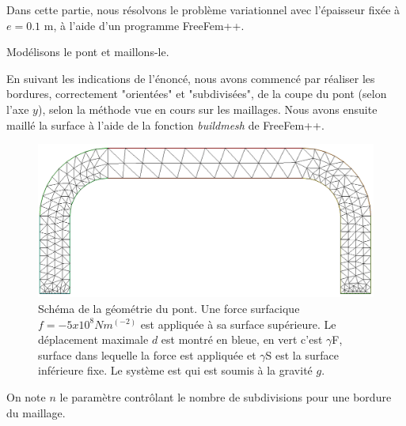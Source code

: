 
Dans cette partie, nous résolvons le problème variationnel avec l'épaisseur fixée à $e=0.1$ m, à l'aide d'un programme FreeFem++.


\begin{problem}{3}
    Modélisons le pont et maillons-le.
\end{problem}


\begin{solution}   
    En suivant les indications de l'énoncé, nous avons commencé par réaliser les bordures, correctement "orientées" et "subdivisées", de la coupe du pont (selon l'axe $y$),
    selon la méthode vue en cours sur les maillages.%
    Nous avons ensuite maillé la surface à l'aide de la fonction \emph{buildmesh} de FreeFem++.

    \begin{figure}[H]        
        \begin{center}
        
            \includegraphics[width=12cm]{imgs/all_maillage_default.PNG}
            \caption{Schéma de la géométrie du pont. Une force surfacique $f= - 5x10^8 N m^(-2)$ est appliquée à sa surface supérieure. Le déplacement maximale $d$ est montré en bleue, en vert c'est $\gamma$F, surface dans lequelle la force est appliquée et $\gamma$S est la surface inférieure fixe. Le système est qui est soumis à la gravité $g$.}
            \label{fig:problem}
        
        \end{center}
    \end{figure}

    On note $n$ le paramètre contrôlant le nombre de subdivisions pour une bordure du maillage.

\end{solution}

